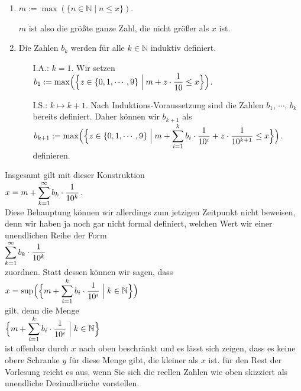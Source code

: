 \begin{enumerate}
\item $m := \max(\{ n \in \mathbb{N} \mid n \leq x \})$.

      $m$ ist also die gr\"o\ss{}te ganze Zahl, die nicht gr\"o\ss{}er als $x$ ist.
\item Die Zahlen $b_k$ werden f\"ur alle $k \in \mathbb{N}$ induktiv definiert.
      \begin{enumerate}
      \item[I.A.:] $k=1$.  Wir setzen
                   \\[0.2cm]
                   \hspace*{1.3cm}
                   $\displaystyle b_1 := \max\Bigl(\Bigl\{ z \in \{ 0, 1, \cdots, 9 \} \Bigm| m + z \cdot \frac{1}{10} \leq x\Bigr\}\Bigr)$.
      \item[I.S.:] $k \mapsto k+1$.  Nach Induktions-Voraussetzung sind die Zahlen $b_1$, $\cdots$, $b_k$
                   bereits definiert.  Daher k\"onnen wir $b_{k+1}$ als
                   \\[0.2cm]
                   \hspace*{1.3cm}
                   $\displaystyle b_{k+1} := \max\Bigl(\Bigl\{ z \in \{ 0, 1, \cdots, 9 \} \Bigm| m + \sum\limits_{i=1}^{k} b_i \cdot \frac{1}{10^i} + z \cdot \frac{1}{10^{k+1}}\leq x\Bigr\}\Bigr)$.
                   \\[0.2cm]
                   definieren.
      \end{enumerate}
\end{enumerate}
Insgesamt gilt mit dieser Konstruktion
\\[0.2cm]
\hspace*{1.3cm}
$\displaystyle x = m + \sum\limits_{k=1}^{\infty} b_k \cdot \frac{1}{10^{k}}$.
\\[0.2cm]
Diese Behauptung k\"onnen wir allerdings zum jetzigen Zeitpunkt nicht beweisen, denn wir haben ja noch gar nicht formal
definiert, welchen Wert wir einer unendlichen Reihe der Form
\\[0.2cm]
\hspace*{1.3cm}
$\displaystyle \sum\limits_{k=1}^{\infty} b_k \cdot \frac{1}{10^{k}}$
\\[0.2cm]
zuordnen.  Statt dessen k\"onnen wir sagen, dass
\\[0.2cm]
\hspace*{1.3cm}
$\displaystyle x = \sup\Bigl(\Bigl\{ m + \sum\limits_{i=1}^{k} b_i \cdot \frac{1}{10^{i}} \Bigm| k \in \mathbb{N} \Bigr\}\Bigr)$
\\[0.2cm]
gilt, denn die Menge
\\[0.2cm]
\hspace*{1.3cm}
$\displaystyle \Bigl\{ m + \sum\limits_{i=1}^{k} b_i \cdot \frac{1}{10^{i}} \Bigm| k \in \mathbb{N} \Bigr\}$
\\[0.2cm]
ist offenbar durch $x$ nach oben beschr\"ankt und es l\"asst sich zeigen, dass es keine 
obere Schranke $y$ f\"ur diese Menge gibt, die  kleiner als $x$ ist.  f\"ur den Rest der Vorlesung
reicht es aus, wenn Sie sich die reellen Zahlen wie oben skizziert als unendliche Dezimalbr\"uche vorstellen.




